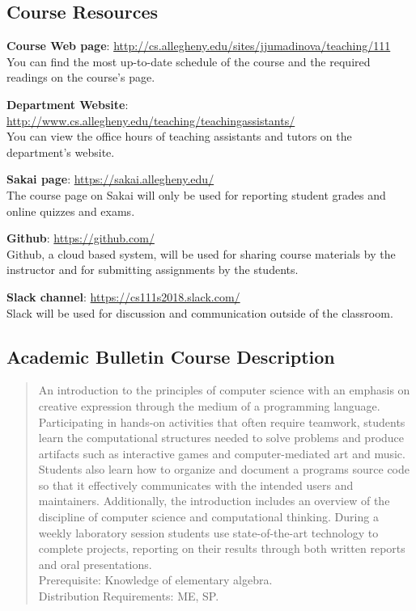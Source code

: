 \subsection*{Course Resources}

\noindent \textbf{Course Web page}: \url{http://cs.allegheny.edu/sites/jjumadinova/teaching/111} \\
\noindent You can find the most up-to-date schedule of the course and the required readings on the course's page.

\noindent \textbf{Department Website}: \url{http://www.cs.allegheny.edu/teaching/teachingassistants/} \\
\noindent You can view the office hours of teaching assistants and tutors on the department's website.

\noindent \textbf{Sakai page}: \url{https://sakai.allegheny.edu/} \\
\noindent The course page on Sakai will only be used for reporting student grades and online quizzes and exams.

\noindent \textbf{Github}: \url{https://github.com/} \\
Github, a cloud based system, will be used for sharing course materials by the instructor and for submitting assignments by the students. 

\noindent \textbf{Slack channel}: \url{https://cs111s2018.slack.com/} \\
Slack will be used for discussion and communication outside of the classroom. 

\subsection*{Academic Bulletin Course Description}

\begin{quote}

An introduction to the principles of computer science with an emphasis on creative expression through the medium of a programming language. Participating in hands-on activities that often require teamwork, students learn the computational structures needed to solve problems and produce artifacts such as interactive games and computer-mediated art and music. Students also learn how to organize and document a programs source code so that it effectively communicates with the intended users and maintainers. Additionally, the introduction includes an overview of the discipline of computer science and computational thinking. During a weekly laboratory session students use state-of-the-art technology to complete projects, reporting on their results through both written reports and oral presentations. \\
\noindent Prerequisite: Knowledge of elementary algebra. \\
\noindent Distribution Requirements: ME, SP. 


\end{quote}

